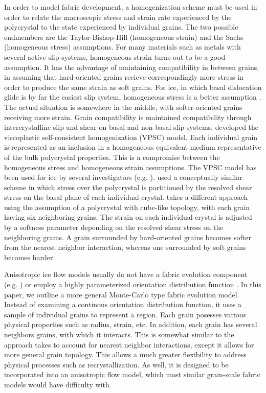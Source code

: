 \documentclass{article}
\begin{document}
In order to model fabric development, a homogenization scheme must be used in order to relate the macroscopic stress and strain rate experienced by the polycrystal to the state experienced by individual grains. The two possible endmembers are the Taylor-Bishop-Hill (homogeneous strain) \citep{taylor} and the Sachs (homogeneous stress) \citep{sachs} assumptions. For many materials such as metals with several active slip systems, homogeneous strain turns out to be a good assumption. It has the advantage of maintaining compatibility in between grains, in assuming that hard-oriented grains recieve correspondingly more stress in order to produce the same strain as soft grains. For ice, in which basal dislocation glide is by far the easiest slip system, homogeneous stress is a better assumption \citep{thorsteinsson2002nni}. The actual situation is somewhere in the middle, with softer-oriented grains receiving more strain. Grain compatibility is maintained compatibility through intercrystalline slip and shear on basal and non-basal slip systems. \citet{molinari} developed the viscoplastic self-consistent homogenization (VPSC) model. Each individual grain is represented as an inclusion in a homogeneous equivalent medium representative of the bulk polycrystal properties. This is a compromise between the homogeneous stress and homogeneous strain assumptions. The VPSC model has been used for ice by several investigators (e.g. \citet{gillet2005}). \citet{azuma96} used a conceptually similar scheme in which stress over the polycrystal is partitioned by the resolved shear stress on the basal plane of each individual crystal. \citet{thorsteinnson2002nni} takes a different approach using the assumption of a polycrystal with cube-like topology, with each grain having six neighboring grains. The strain on each individual crystal is adjusted by a softness parameter depending on the resolved shear stress on the neighboring grains. A grain surrounded by hard-oriented grains becomes softer from the nearest neighbor interaction, whereas one surrounded by soft grains becomes harder.

Anisotropic ice flow models usually do not have a fabric evolution component (e.g. \citet{pettit2007}) or employ a highly parameterized orientation distribution function \citep{gillet2006}. In this paper, we outline a more general Monte-Carlo type fabric evolution model. Instead of examining a continous orientation distribution function, it uses a sample of individual grains to represent a region. Each grain posesses various physical properties such as radius, strain, etc. In addition, each grain has several neighbors grains, with which it interacts. This is somewhat similar to the approach \citet{thorsteinnson2002nni} takes to account for nearest neighbor interactions, except it allows for more general grain topology.
This allows a much greater flexibility to address physical processes such as recrystallization. As well, it is designed to be incorporated into an anisotropic flow model, which most similar grain-scale fabric models would have difficulty with. 
\end{document}
